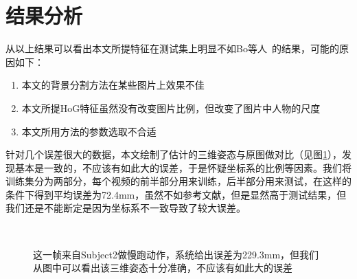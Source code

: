 \section{结果分析}
\label{sec:analysis}
从以上结果可以看出本文所提特征在测试集上明显不如Bo等人~\cite{bo2010twin}的结果，可能的原因如下：
\begin{enumerate}
  \item 本文的背景分割方法在某些图片上效果不佳
  \item 本文所提HoG特征虽然没有改变图片比例，但改变了图片中人物的尺度
  \item 本文所用方法的参数选取不合适
\end{enumerate}

针对几个误差很大的数据，本文绘制了估计的三维姿态与原图做对比（见图\ref{fig:bigerr1}），发现基本是一致的，不应该有如此大的误差，于是怀疑坐标系的比例等因素。我们将训练集分为两部分，每个视频的前半部分用来训练，后半部分用来测试，在这样的条件下得到平均误差为72.4mm，虽然不如参考文献，但是显然高于测试结果，但我们还是不能断定是因为坐标系不一致导致了较大误差。

\begin{figure}[htbp]
  \centering
  \hspace{.5cm}
  \hspace{.5cm}
  \\
  \hspace{.5cm}
  \hspace{.5cm}
  \caption[较大误差示意1]{这一帧来自Subject2做慢跑动作，系统给出误差为229.3mm，但我们从图中可以看出该三维姿态十分准确，不应该有如此大的误差}\label{fig:bigerr1}
\end{figure}
